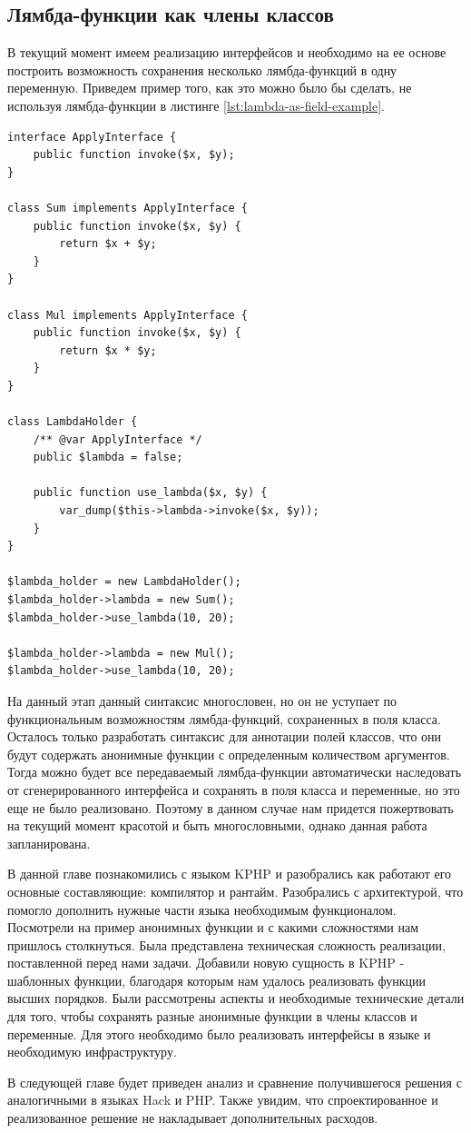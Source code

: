 \subsection{Лямбда-функции как члены классов}
В текущий момент имеем реализацию интерфейсов и необходимо на ее основе построить возможность сохранения несколько лямбда-функций в одну переменную.
Приведем пример того, как это можно было бы сделать, не используя лямбда-функции в листинге \ref{lst:lambda-as-field-example}.
\begin{lstlisting}[caption={Пример замены сохранения лямбда-функции в поле класса},label={lst:lambda-as-field-example}]
interface ApplyInterface {
    public function invoke($x, $y);
}

class Sum implements ApplyInterface {
    public function invoke($x, $y) {
        return $x + $y;
    }
}

class Mul implements ApplyInterface {
    public function invoke($x, $y) {
        return $x * $y;
    }
}

class LambdaHolder {
    /** @var ApplyInterface */
    public $lambda = false;

    public function use_lambda($x, $y) {
        var_dump($this->lambda->invoke($x, $y));
    }
}

$lambda_holder = new LambdaHolder();
$lambda_holder->lambda = new Sum();
$lambda_holder->use_lambda(10, 20);

$lambda_holder->lambda = new Mul();
$lambda_holder->use_lambda(10, 20);
\end{lstlisting}

На данный этап данный синтаксис многословен, но он не уступает по функциональным возможностям лямбда-функций, сохраненных в поля класса.
Осталось только разработать синтаксис для аннотации полей классов, что они будут содержать анонимные функции с определенным количеством аргументов.
Тогда можно будет все передаваемый лямбда-функции автоматически наследовать от сгенерированного интерфейса и сохранять в поля класса и переменные, но это еще не было реализовано.
Поэтому в данном случае нам придется пожертвовать на текущий момент красотой и быть многословными, однако данная работа запланирована.

\chapterconclusion
В данной главе познакомились с языком KPHP и разобрались как работают его основные составляющие: компилятор и рантайм.
Разобрались с архитектурой, что помогло дополнить нужные части языка необходимым функционалом.
Посмотрели на пример анонимных функции и с какими сложностями нам пришлось столкнуться.
Была представлена техническая сложность реализации, поставленной перед нами задачи.
Добавили новую сущность в KPHP - шаблонных функции, благодаря которым нам удалось реализовать функции высших порядков.
Были рассмотрены аспекты и необходимые технические детали для того, чтобы сохранять разные анонимные функции в члены классов и переменные.
Для этого необходимо было реализовать интерфейсы в языке и необходимую инфраструктуру.

В следующей главе будет приведен анализ и сравнение получившегося решения с аналогичными в языках Hack и PHP.
Также увидим, что спроектированное и реализованное решение не накладывает дополнительных расходов.
